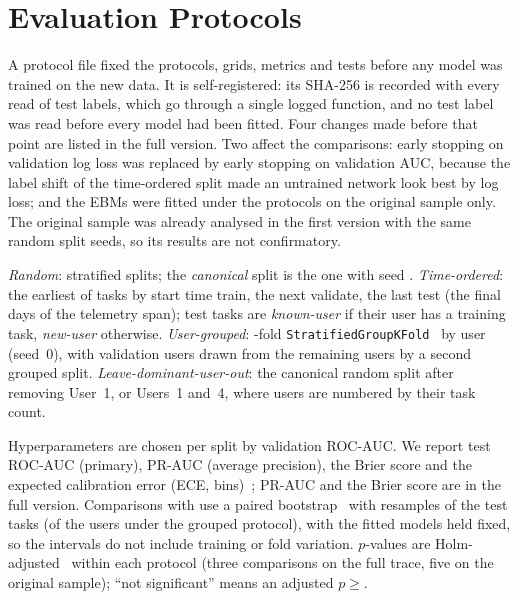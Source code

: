 \section{Evaluation Protocols}
\label{sec:protocols}

A protocol file fixed the protocols, grids, metrics and tests before any model was trained on the new data. It is self-registered: its SHA-256 is recorded with every read of test labels, which go through a single logged function, and no test label was read before every model had been fitted. Four changes made before that point are listed in the full version. Two affect the comparisons: early stopping on validation log loss was replaced by early stopping on validation AUC, because the label shift of the time-ordered split made an untrained network look best by log loss; and the EBMs were fitted under the protocols on the original sample only. The original sample was already analysed in the first version with the same random split seeds, so its results are not confirmatory.

\emph{Random}:  stratified  splits; the \emph{canonical} split is the one with seed . \emph{Time-ordered}: the earliest  of tasks by start time train, the next  validate, the last  test (the final  days of the telemetry span); test tasks are \emph{known-user} if their user has a training task, \emph{new-user} otherwise. \emph{User-grouped}: -fold \texttt{StratifiedGroupKFold}~\cite{pedregosa2011sklearn} by user (seed~0), with validation users drawn from the remaining users by a second grouped split. \emph{Leave-dominant-user-out}: the canonical random split after removing User~1, or Users~1 and~4, where users are numbered by their task count.

Hyperparameters are chosen per split by validation ROC-AUC. We report test ROC-AUC (primary), PR-AUC (average precision), the Brier score and the expected calibration error (ECE,  bins)~\cite{guo2017calibration}; PR-AUC and the Brier score are in the full version. Comparisons with \kaam{} use a paired bootstrap~\cite{efron1993bootstrap} with  resamples of the test tasks (of the users under the grouped protocol), with the fitted models held fixed, so the intervals do not include training or fold variation. $p$-values are Holm-adjusted~\cite{holm1979simple} within each protocol (three comparisons on the full trace, five on the original sample); ``not significant'' means an adjusted $p\geq$.
